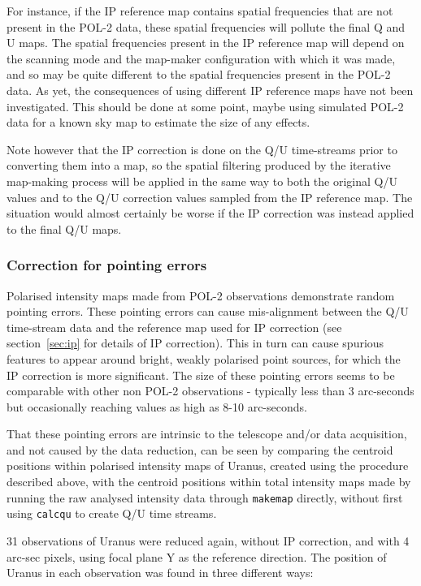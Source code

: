 \documentclass[twoside,11pt]{starlink}
\begin{document}
For instance, if the IP reference map contains spatial frequencies that
are not present in the POL-2 data, these spatial frequencies will pollute
the final Q and U maps. The spatial frequencies present in the IP
reference map will depend on the scanning mode and the map-maker
configuration with which it was made, and so may be quite different to
the spatial frequencies present in the POL-2 data. As yet, the
consequences of using different IP reference maps have not been
investigated. This should be done at some point, maybe using simulated
POL-2 data for a known sky map to estimate the size of any effects.

Note however that the IP correction is done on the Q/U time-streams prior
to converting them into a map, so the spatial filtering produced by the
iterative map-making process will be applied in the same way to both the
original Q/U values and to the Q/U correction values sampled from the IP
reference map. The situation would almost certainly be worse if the IP
correction was instead applied to the final Q/U maps.

\subsubsection{Correction for pointing errors}
Polarised intensity maps made from POL-2 observations demonstrate random
pointing errors. These pointing errors can cause mis-alignment between the
Q/U time-stream data and the reference map used for IP correction (see
section~\ref{sec:ip} for details of IP correction). This in turn can cause
spurious features to appear around bright, weakly polarised point
sources, for which the IP correction is more significant. The size of
these pointing errors seems to be comparable with other non POL-2
observations - typically less than 3 arc-seconds but occasionally reaching
values as high as 8-10 arc-seconds.

That these pointing errors are intrinsic to the telescope and/or data
acquisition, and not caused by the data reduction, can be seen by
comparing the centroid positions within polarised intensity maps of
Uranus, created using the procedure described above, with the centroid
positions within total intensity maps made by running the raw analysed
intensity data through \texttt{makemap} directly, without first using
\texttt{calcqu} to create Q/U time streams.

31 observations of Uranus were reduced again, without IP correction, and
with 4 arc-sec pixels, using focal plane Y as the reference direction.
The position of Uranus in each observation was found in three different ways:
\end{document}
